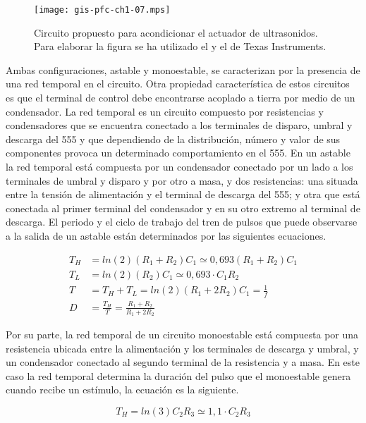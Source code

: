 \begin{sidewaysfigure}
	\begin{center}
		\texttt{[image: gis-pfc-ch1-07.mps]}
	\end{center}
	\caption[Circuito acondicionador de la sección de emisión]{Circuito
	propuesto para acondicionar el actuador de ultrasonidos. Para
	elaborar la figura se ha utilizado el  y el 
	de Texas Instruments.}
	\label{fig:txconditioner}
\end{sidewaysfigure}

Ambas configuraciones, astable y monoestable, se caracterizan por la
presencia de una red temporal en el circuito. Otra propiedad característica
de estos circuitos es que el terminal de control debe encontrarse acoplado
a tierra por medio de un condensador. La red temporal es un circuito
compuesto por resistencias y condensadores que se encuentra conectado a los
terminales de disparo, umbral y descarga del 555 y que dependiendo de la
distribución, número y valor de sus componentes provoca un determinado
comportamiento en el 555. En un astable la red temporal está compuesta por
un condensador conectado por un lado a los terminales de umbral y disparo y
por otro a masa, y dos resistencias: una situada entre la tensión de
alimentación y el terminal de descarga del 555; y otra que está conectada
al primer terminal del condensador y en su otro extremo al terminal de
descarga. El periodo y el ciclo de trabajo del tren de pulsos que puede
observarse a la salida de un astable están determinados por las siguientes
ecuaciones.

\begin{align}
	T_H &= ln(2)(R_1 + R_2)C_1 \simeq 0,693(R_1 + R_2)C_1 \\
	T_L &= ln(2)(R_2)C_1 \simeq 0,693\cdot C_1R_2 \\
	T &= T_H + T_L = ln(2)(R_1 + 2R_2)C_1 = \frac{1}{f} \\
	D &= \frac{T_H}{T} = \frac{R_1 + R_2}{R_1 + 2R_2}
	\label{eq:astable}
\end{align}

Por su parte, la red temporal de un circuito monoestable está compuesta por
una resistencia ubicada entre la alimentación y los terminales de descarga
y umbral, y un condensador conectado al segundo terminal de la resistencia
y a masa. En este caso la red temporal determina la duración del pulso que
el monoestable genera cuando recibe un estímulo, la ecuación es la
siguiente.

\begin{equation}
	T_H = ln(3)C_2R_3 \simeq 1,1\cdot C_2R_3
	\label{eq:monostable}
\end{equation}

